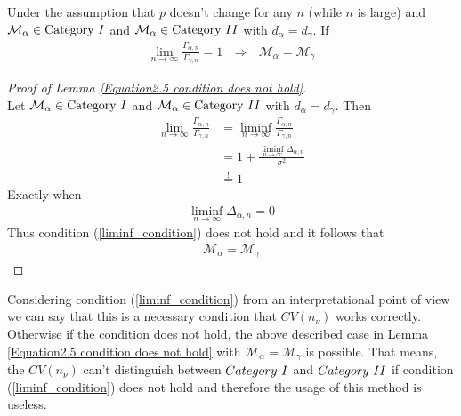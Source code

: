 \documentclass[Research_Module_ES.tex]{subfiles}
\begin{document}
\begin{lemma}
	\label{Equation2.5 condition does not hold}
	Under the assumption that $p$ doesn't change for any $n$ (while $n$ is large) and $\mathcal{M}_\alpha\in\text{Category}~\RM{1}$ and $\mathcal{M}_\alpha\in\text{Category}~\RM{2}$ with $d_\alpha=d_\gamma$. If
	\begin{align*}
		\lim_{n\rightarrow\infty}\frac{\Gamma_{\alpha,n}}{\Gamma_{\gamma,n}}=1~~~\Rightarrow~~~\mathcal{M}_\alpha=\mathcal{M}_\gamma
	\end{align*} 
\end{lemma}

\begin{proof}[Proof of Lemma \ref{Equation2.5 condition does not hold}]~\\
	Let $\mathcal{M}_\alpha\in\text{Category}~\RM{1}$ and $\mathcal{M}_\alpha\in\text{Category}~\RM{2}$ with $d_\alpha=d_\gamma$. Then 
	\begin{align*}
		\lim_{n\rightarrow\infty}\frac{\Gamma_{\alpha,n}}{\Gamma_{\gamma,n}}&=\liminf_{n\rightarrow\infty}\frac{\Gamma_{\alpha,n}}{\Gamma_{\gamma,n}}\\
		&=1+\frac{\liminf_{n\rightarrow\infty}\Delta_{\alpha,n}}{\sigma^2}\\
		&\stackrel{!}{=}1
	\end{align*}
	Exactly when
	\begin{align*}
		\liminf_{n\rightarrow\infty}\Delta_{\alpha,n}=0
	\end{align*}
	Thus condition (\ref{liminf_condition}) does not hold and it follows that
	\begin{align*}
		\mathcal{M}_\alpha=\mathcal{M}_\gamma
	\end{align*}
\end{proof}

Considering condition (\ref{liminf_condition}) from an interpretational point of view we can say that
this is a necessary condition that $CV(n_\nu)$ works correctly. Otherwise if the condition does not hold, the above described case in Lemma \ref{Equation2.5 condition does not hold} with $\mathcal{M}_\alpha=\mathcal{M}_\gamma$ is possible. That means, the $CV(n_\nu)$ can't distinguish between $Category~\RM{1}$ and $Category~\RM{2}$ if condition (\ref{liminf_condition}) does not hold and therefore the usage of this method is useless.
\end{document}
